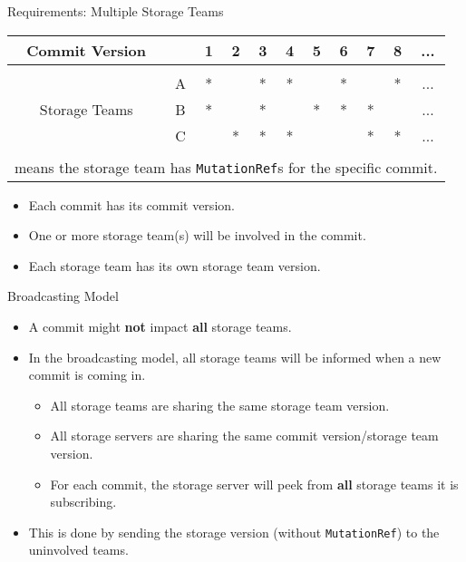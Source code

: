 \documentclass[9pt]{beamer}
\begin{document}
    \begin{frame}{Requirements: Multiple Storage Teams}
        \begin{table}
            \begin{center}
                \begin{tabular}{ccccccccccc}
                    Commit Version & &1 & 2 & 3 & 4 & 5 & 6 & 7 & 8 & ... \\
                    \hline\\
                    \multirow{3}{*}{Storage Teams} & A & * & & * & * & & * & & * & ...\\
                    & B & * & & * & & * & * & * & & ...\\
                    & C &  & * & * & * & & & * & * & ... \\
                    \hspace{0.2em}\\
                    \multicolumn{11}{l}{\footnotesize * means the storage team has \texttt{MutationRef}s for the specific commit.}
                \end{tabular}
            \end{center}
            
        \end{table}
        
        \hspace{1em}
        
        \begin{itemize}
            \item Each commit has its commit version.
            \item One or more storage team(s) will be involved in the commit.
            \item Each storage team has its own storage team version.
        \end{itemize}
    \end{frame}
    
    \begin{frame}{Broadcasting Model}
        \begin{itemize}
            \item A commit might \textbf{not} impact \textbf{all} storage teams.
            \item In the broadcasting model, all storage teams will be informed when a new commit is coming in.
            \begin{itemize}
                \item All storage teams are sharing the same storage team version.
                \item All storage servers are sharing the same commit version/storage team version.
                \item For each commit, the storage server will peek from \textbf{all} storage teams it is subscribing.
            \end{itemize}
            \item This is done by sending the storage version (without \texttt{MutationRef}) to the uninvolved teams.
        \end{itemize}
    \end{frame}
    
\end{document}
